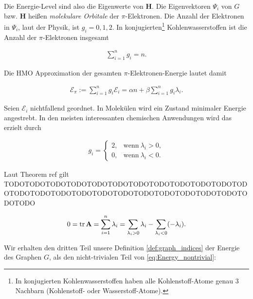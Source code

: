         Die Energie-Level sind also die Eigenwerte von $\mathbf H$.
        Die Eigenvektoren $\Psi_i$ von $G$ bzw. $\mathbf H$ heißen \textit{molekulare Orbitale} der $\pi$-Elektronen.
        Die Anzahl der Elektronen in $\Psi_i$, laut der Physik, ist $g_i = 0, 1, 2$.
        In konjugierten\footnote{In konjugierten Kohlenwasserstoffen haben alle Kohlenstoff-Atome genau $3$ Nachbarn (Kohlenstoff- oder Wasserstoff-Atome).} Kohlenwasserstoffen ist die Anzahl der $\pi$-Elektronen insgesamt

        \begin{align*}
            \sum_{i=1}^n g_i = n.
        \end{align*}

        Die HMO Approximation der gesamten $\pi$-Elektronen-Energie lautet damit

        \begin{align} \label{eq:Energy_nontrivial}
            \mathcal E_\pi
            :=
            \sum_{i=1}^n g_i \mathcal E_i
            =
            \alpha n + \beta \sum_{i=1}^n g_i \lambda_i.
        \end{align}

        Seien $\mathcal E_i$ nichtfallend geordnet.
        In Molekülen wird ein Zustand minimaler Energie angestrebt.
        In den meisten interessanten chemischen Anwendungen wird das erzielt durch

        \begin{align*}
            g_i
            =
            \begin{cases}
                2, & \text{wenn} ~ \lambda_i > 0, \\
                0, & \text{wenn} ~ \lambda_i < 0.
            \end{cases}
        \end{align*}

        Laut Theorem ref gilt TODOTODOTODOTODOTODOTODOTODOTODOTODOTODOTODOTODOTODOTODOTODOTODOTODOTODOTODOTODOTODOTODOTODOTODOTODO

        \begin{align*}
            0
            =
            \operatorname{tr} \mathbf A
            =
            \sum_{i=1}^n \lambda_i
            =
            \sum_{\lambda_i > 0} \lambda_i
            -
            \sum_{\lambda_i < 0} (-\lambda_i).
        \end{align*}

        Wir erhalten den dritten Teil unsere Definition \ref{def:graph_indices} der Energie des Graphen $G$, als den nicht-trivialen Teil von \eqref{eq:Energy_nontrivial}:

